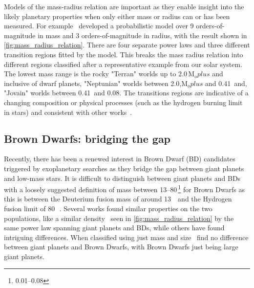 Models of the mass-radius relation are important as they enable insight into the likely planetary properties when only either mass or radius can or has been measured.
For example~\citet{chen_probabilistic_2016} developed a probabilistic model over 9 orders-of-magnitude in mass and 3 orders-of-magnitude in radius, with the result shown in \cref{fig:mass_radius_relation}.
There are four separate power laws and three different transition regions fitted by the model.
This breaks the mass radius relation into different regions classified after a representative example from our solar system.
The lowest mass range is the rocky "Terran" worlds up to 2.0\,\(\textrm{M}_oplus\) and inclusive of dwarf planets, "Neptunian" worlds between 2.0,\(\textrm{M}_oplus\) and 0.41\,\Mjup{} and, "Jovain" worlds between 0.41\,\Mjup{} and 0.08\Msun{}.
The transitions regions are indicative of a changing composition or physical processes (such as the hydrogen burning limit in stars) and consistent with other works~\citep[e.g.][]{weiss_mass_2013, dieterich_solar_2014, hatzes_definition_2015, rogers_most_2015}.

\subsection{Brown Dwarfs: bridging the gap}
Recently, there has been a renewed interest in Brown Dwarf (BD) candidates triggered by exoplanetary searches as they bridge the gap between giant planets and low-mass stars.
It is difficult to distinguish between giant planets and BDs with a loosely suggested definition of mass between 13--80\,\Mjup{}\footnote{0.01--0.08\Msun{}} for Brown Dwarfs as this is between the Deuterium fusion mass of around 13\,\Mjup{}~\citep[e.g.][]{spiegel_deuteriumburning_2011} and the Hydrogen fusion limit of 80\,\Mjup{}~\citep{chabrier_theory_2000, dieterich_solar_2014}.
Several works found similar properties on the two populations, like a similar density~\citep{hatzes_definition_2015, chen_probabilistic_2016} seen in \cref{fig:mass_radius_relation} by the same power law spanning giant planets and BDs, while others have found intriguing differences.
When classified using just mass and size~\citet{chen_probabilistic_2016} find no difference between giant planets and Brown Dwarfs, with Brown Dwarfs just being large giant planets.

